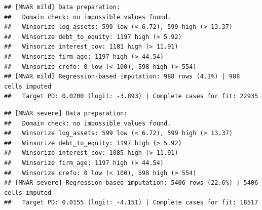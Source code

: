 \documentclass[
]{article}
\newenvironment{Shaded}{\begin{snugshade}}{\end{snugshade}}
\newcommand{\AttributeTok}[1]{\textcolor[rgb]{0.13,0.29,0.53}{#1}}
\newcommand{\CommentTok}[1]{\textcolor[rgb]{0.56,0.35,0.01}{\textit{#1}}}
\newcommand{\FunctionTok}[1]{\textcolor[rgb]{0.13,0.29,0.53}{\textbf{#1}}}
\newcommand{\NormalTok}[1]{#1}
\newcommand{\OtherTok}[1]{\textcolor[rgb]{0.56,0.35,0.01}{#1}}
\newcommand{\SpecialCharTok}[1]{\textcolor[rgb]{0.81,0.36,0.00}{\textbf{#1}}}
\newcommand{\StringTok}[1]{\textcolor[rgb]{0.31,0.60,0.02}{#1}}
\begin{document}
\begin{Shaded}
\end{Shaded}

\begin{verbatim}
## [MNAR mild] Data preparation:
##   Domain check: no impossible values found.
##   Winsorize log_assets: 599 low (< 6.72), 599 high (> 13.37)
##   Winsorize debt_to_equity: 1197 high (> 5.92)
##   Winsorize interest_cov: 1181 high (> 11.91)
##   Winsorize firm_age: 1197 high (> 44.54)
##   Winsorize crefo: 0 low (< 100), 598 high (> 554)
## [MNAR mild] Regression-based imputation: 988 rows (4.1%) | 988 cells imputed
##   Target PD: 0.0200 (logit: -3.893) | Complete cases for fit: 22935
\end{verbatim}

\begin{Shaded}
\end{Shaded}

\begin{verbatim}
## [MNAR severe] Data preparation:
##   Domain check: no impossible values found.
##   Winsorize log_assets: 599 low (< 6.72), 599 high (> 13.37)
##   Winsorize debt_to_equity: 1197 high (> 5.92)
##   Winsorize interest_cov: 1085 high (> 11.91)
##   Winsorize firm_age: 1197 high (> 44.54)
##   Winsorize crefo: 0 low (< 100), 598 high (> 554)
## [MNAR severe] Regression-based imputation: 5406 rows (22.6%) | 5406 cells imputed
##   Target PD: 0.0155 (logit: -4.151) | Complete cases for fit: 18517
\end{verbatim}

\begin{Shaded}
\end{Shaded}
\end{document}
